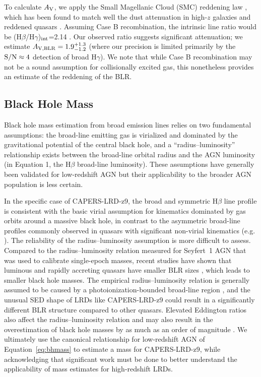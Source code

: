 \documentclass[twocolumn]{aastex7}
\newcommand{\src}{CAPERS-LRD-z9}
\begin{document}
To calculate $A_{\rm V}$, we apply the Small Magellanic Cloud (SMC) reddening law \citep{gordon03}, which has been found to match well the dust attenuation in high-$z$ galaxies \citep{capak15,reddy15,reddy18} and reddened quasars \citep[e.g. see][]{hopkins04}. 
Assuming Case B recombination, the intrinsic line ratio would be (H$\beta$/H$\gamma$)$_{\rm int}$=2.14 \citep{osterbrock89}. Our observed ratio suggests significant attenuation; we estimate $A_{\rm V,BLR}=1.9^{+1.3}_{-1.2}$ (where our precision is limited primarily by the ${\rm S/N}\approx4$ detection of broad H$\gamma$). We note that while Case B recombination may not be a sound assumption for collisionally excited gas, this nonetheless provides an estimate of the reddening of the BLR.

\subsection{Black Hole Mass}\label{sec:bhmass}

Black hole mass estimation from broad emission lines relies on two fundamental assumptions: the broad-line emitting gas is virialized and dominated by the gravitational potential of the central black hole, and a ``radius--luminosity'' relationship exists between the broad-line orbital radius and the AGN luminosity (in Equation 1, the H$\beta$ broad-line luminosity). These assumptions have generally been validated for low-redshift AGN \citep[e.g.][]{Bentz2006, Cackett2021} but their applicability to the broader AGN population is less certain. 

In the specific case of \src{}, the broad and symmetric H$\beta$ line profile is consistent with the basic virial assumption for kinematics dominated by gas orbits around a massive black hole, in contrast to the asymmetric broad-line profiles commonly observed in quasars with significant non-virial kinematics (e.g. \citealt{U2022, Fries2024}). The reliability of the radius--luminosity assumption is more difficult to assess. Compared to the radius--luminosity relation measured for Seyfert~1 AGN that was used to calibrate single-epoch masses, recent studies have shown that luminous and rapidly accreting quasars have smaller BLR sizes \citep{Du2016, FonsecaAlvarez2020}, which leads to smaller black hole masses. The empirical radius--luminosity relation is generally assumed to be caused by a photoionization-bounded broad-line region \citep[e.g.][]{Korista2004}, and the unusual SED shape of LRDs like \src{} could result in a significantly different BLR structure compared to other quasars. Elevated Eddington ratios also affect the radius--luminosity relation and may also result in the overestimation of black hole masses by as much as an order of magnitude \citep[e.g..][]{Du2016,lupi24}. We ultimately use the canonical relationship for low-redshift AGN of Equation~\ref{eq:bhmass} to estimate a mass for \src{}, while acknowledging that significant work must be done to better understand the applicability of mass estimates for high-redshift LRDs.
\end{document}
